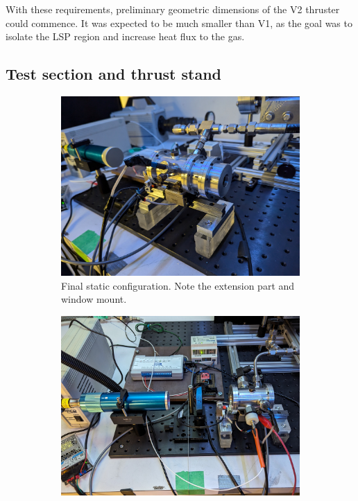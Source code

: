             With these requirements, preliminary geometric dimensions of the V2 thruster could commence. It was expected to be much smaller than V1, as the goal was to isolate the LSP region and increase heat flux to the gas.
        
        \subsection{Test section and thrust stand}

            \begin{figure}[!ht]
                \centering
                \begin{subfigure}[t]{0.45\textwidth}
                    \centering
                    \includegraphics[width=\textwidth]{assets/3 design/V2 Static configuration.jpg}
                    \caption{Final static configuration. Note the extension part and window mount.}
                \end{subfigure}
                \hfill
                \begin{subfigure}[t]{0.45\textwidth}
                    \centering
                    \includegraphics[width=\textwidth]{assets/3 design/V2 flowing setup.jpg}

\end{subfigure}
\end{figure}
